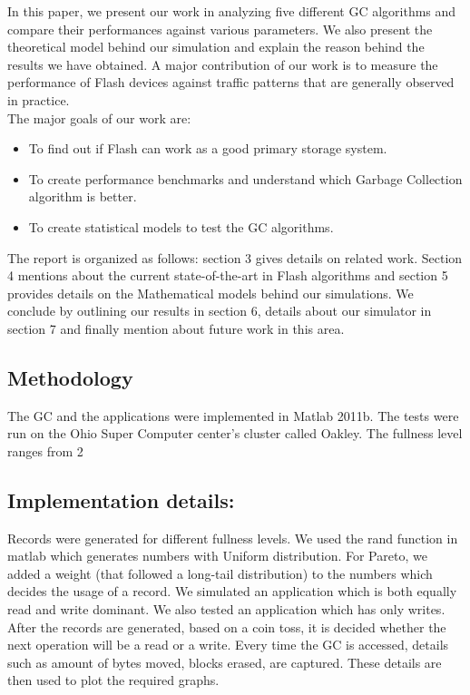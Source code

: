 	In this paper, we present our work in analyzing five different GC algorithms and compare their performances against various parameters. We also present the theoretical model behind our simulation and explain the reason behind the results we have obtained. A major contribution of our work is to measure the performance of Flash devices against traffic patterns that are generally observed in practice. \\
The major goals of our work are:
\begin{itemize}
\item To find out if Flash can work as a good primary storage system. 
\item To create performance benchmarks and understand which Garbage Collection algorithm is better. 
\item To create statistical models to test the GC algorithms.
\end{itemize}

	The report is organized as follows: section 3 gives details on related work. Section 4 mentions about the current state-of-the-art in Flash algorithms and section 5 provides details on the Mathematical models behind our simulations. We conclude by outlining our results in section 6, details about our simulator in section 7 and finally mention about future work in this area.


\subsection{Methodology}
The GC and the applications were implemented in Matlab 2011b. The tests were run on the Ohio Super Computer center’s cluster called Oakley. The fullness level ranges from 2%

\subsection{Implementation details:}
Records were generated for different fullness levels. We used the rand function in matlab which generates numbers with Uniform distribution. For Pareto, we added a weight (that followed a long-tail distribution) to the numbers which decides the usage of a record.
We simulated an application which is both equally read and write dominant. We also tested an application which has only writes. After the records are generated, based on a coin toss, it is decided whether the next operation will be a read or a write. Every time the GC is accessed, details such as amount of bytes moved, blocks erased, are captured. These details are then used to plot the required graphs. 

